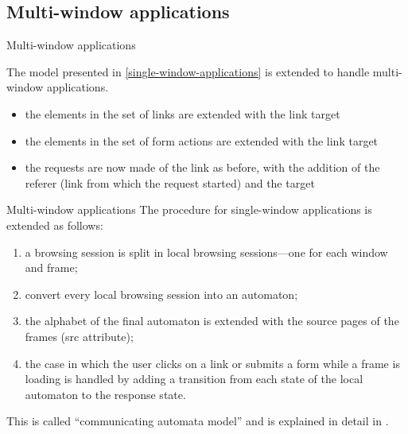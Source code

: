 \documentclass[usenames,dvipsnames]{beamer}
\begin{document}
\subsection{Multi-window applications}

\begin{frame}{Multi-window applications}

The model presented in \cref{single-window-applications} is extended to handle multi-window applications.

\begin{itemize}
  \item the elements in the set of links are extended with the link target
  \item the elements in the set of form actions are extended with the link target
  \item the requests are now made of the link as before, with the addition of the referer (link from which the request started) and the target
\end{itemize}

\end{frame}

\begin{frame}{Multi-window applications}
The procedure for single-window applications is extended as follows:

\begin{enumerate}
  \item a browsing session is split in local browsing sessions---one for each window and frame;
  \item convert every local browsing session into an automaton;
  \item the alphabet of the final automaton is extended with the source pages of the frames (src attribute);
  \item the case in which the user clicks on a link or submits a form while a frame is loading is handled by adding a transition from each state of the local automaton to the response state.
\end{enumerate}

This is called ``communicating automata model'' and is explained in detail in \cite{Haydar2004}.

\end{frame}
\end{document}
